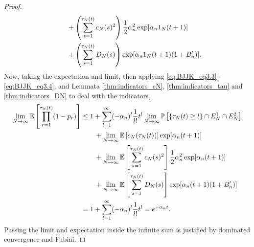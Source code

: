 \begin{proof}
\begin{align}
    &\qquad+ \left( \sum_{s=1}^{\tau_N(t)} c_N(s)^2 \right)
        \frac{1}{2} \alpha_n^2 \exp[ \alpha_n 1_N (t+1) ] \notag\\
    &\qquad+ \left( \sum_{s=1}^{\tau_N(t)} D_N(s) \right)
        \exp[ \alpha_n 1_N (t+1) (1+B_n^\prime) ] . \label{eq:021}
\end{align}
Now, taking the expectation and limit, then applying \eqref{eq:BJJK_eq3.3}--\eqref{eq:BJJK_eq3.4}, and Lemmata \ref{thm:indicators_cN}, \ref{thm:indicators_tau} and \ref{thm:indicators_DN} to deal with the indicators,
\begin{align}
\lim_{N\to\infty} \mathbb{E} \left[ \prod_{r=1}^{\tau_N(t)} (1-p_r) \right]
&\leq 1+ \sum_{l=1}^{\infty} (-\alpha_n)^l \frac{1}{l!} t^l
        \lim_{N\to\infty} \mathbb{P} \left[ \{\tau_N(t) \geq l\} \cap E_N^1 \cap E_N^2 \right] \notag\\
    &\qquad+ \lim_{N\to\infty} \mathbb{E} \left[ c_N(\tau_N(t)) \right]
        \exp[ \alpha_n (t+1) ] \notag\\
    &\qquad+ \lim_{N\to\infty} \mathbb{E} \left[ \sum_{s=1}^{\tau_N(t)} 
        c_N(s)^2 \right]
        \frac{1}{2} \alpha_n^2 \exp[ \alpha_n (t+1) ] \notag\\
    &\qquad+ \lim_{N\to\infty} \mathbb{E} \left[ \sum_{s=1}^{\tau_N(t)} D_N(s) \right]
        \exp[ \alpha_n (t+1) (1+B_n^\prime) ] \notag\\
&= 1+ \sum_{l=1}^{\infty} (-\alpha_n)^l \frac{1}{l!} t^l
= e^{-\alpha_n t}. \label{eq:022}
\end{align}
Passing the limit and expectation inside the infinite sum is justified by dominated convergence and Fubini.


\end{proof}
